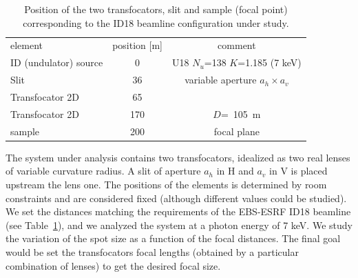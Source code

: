 \documentclass{iucr}              %
\begin{document}
\begin{table}[]
    \label{table:id18parameters}
    \caption{Position of the two transfocators, slit and sample (focal point) corresponding to the ID18 beamline configuration under study. }
    \centering
    \begin{tabular}{l|c|c}
         element & position [m] & comment\\
         ID (undulator) source& 0 & U18 $N_u$=138 $K$=1.185 (7 keV)\\
         Slit & 36 &
         variable aperture $a_h\times a_v$
         \\
         Transfocator 2D & 65 & 
         \\
         Transfocator 2D & 170 & $D$=~\SI{105}{\meter} \\
         sample & 200 & focal plane
    \end{tabular}


\end{table}

The system under analysis contains two transfocators, idealized as two real lenses of variable curvature radius. A slit of aperture $a_h$ in H and $a_v$ in V is placed upstream the lens one. The positions of the elements is determined by room constraints and are considered fixed (although different values could be studied). We set the distances matching the requirements of the EBS-ESRF ID18 beamline (see Table~\ref{table:id18parameters}), and we analyzed the system at a photon energy of 7 keV. We study the variation of the spot size as a function of the focal distances. The final goal would be set the transfocators focal lengths (obtained by a particular combination of lenses) to get the desired focal size. 


\end{document}

